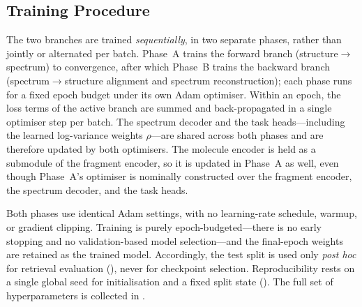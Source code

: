 \subsection{Training Procedure}
\label{sec:training-procedure}

The two branches are trained \emph{sequentially}, in two separate phases, rather than jointly or alternated per batch. Phase~A trains the forward branch (structure$\rightarrow$spectrum) to convergence, after which Phase~B trains the backward branch (spectrum$\rightarrow$structure alignment and spectrum reconstruction); each phase runs for a fixed epoch budget under its own Adam optimiser.
Within an epoch, the loss terms of the active branch are summed and back-propagated in a single optimiser step per batch.
The spectrum decoder and the task heads---including the learned log-variance weights $\rho$---are shared across both phases and are therefore updated by both optimisers.
The molecule encoder is held as a submodule of the fragment encoder, so it is updated in Phase~A as well, even though Phase~A's optimiser is nominally constructed over the fragment encoder, the spectrum decoder, and the task heads.

Both phases use identical Adam settings, with no learning-rate schedule, warmup, or gradient clipping.
Training is purely epoch-budgeted---there is no early stopping and no validation-based model selection---and the final-epoch weights are retained as the trained model.
Accordingly, the test split is used only \emph{post hoc} for retrieval evaluation (), never for checkpoint selection.
Reproducibility rests on a single global seed for initialisation and a fixed split state (). The full set of hyperparameters is collected in .

